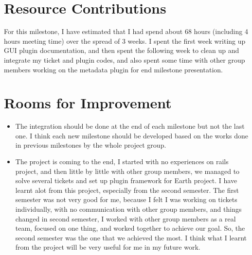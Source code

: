 \section*{Resource Contributions}

For this milestone, I have estimated that I had spend about 68 hours (including 4 hours meeting time) over the spread of 3 weeks. I spent the first week writing up GUI plugin documentation, and then spent the following week to clean up and integrate my ticket and plugin codes, and also spent some time with other group members working on the metadata plugin for end milestone presentation. 

\section*{Rooms for Improvement}

\begin{itemize}
   \item The integration should be done at the end of each milestone but not the last one. I think each new milestone should be developed based on the works done in previous milestones by the whole project group.
   \item The project is coming to the end, I started with no experiences on rails project, and then little by little with other group members, we managed to solve several tickets and set up plugin framework for Earth project. I have learnt alot from this project, especially from the second semester. The first semester was not very good for me, because I felt I was working on tickets individually, with no communication with other group members, and things changed in second semester, I worked with other group members as a real team, focused on one thing, and worked together to achieve our goal. So, the second semester was the one that we achieved the most. I think what I learnt from the project will be very useful for me in my future work.
\end{itemize}
